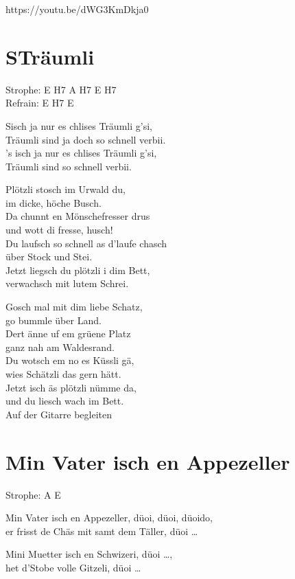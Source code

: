 \documentclass[
  letterpaper,
  twoside=false]{scrbook}
\begin{document}
https://youtu.be/dWG3KmDkja0

\hypertarget{struxe4umli}{%
\chapter{S\textquotesingle Träumli}\label{struxe4umli}}

Strophe: E H7 A H7 E H7\\
Refrain: E H7 E

S\textquotesingle isch ja nur es chlises Träumli g'si,\\
Träumli sind ja doch so schnell verbii.\\
's isch ja nur es chlises Träumli g'si,\\
Träumli sind so schnell verbii.

Plötzli stosch im Urwald du,\\
im dicke, höche Busch.\\
Da chunnt en Mönschefresser drus\\
und wott di fresse, husch!\\
Du laufsch so schnell as d'laufe chasch\\
über Stock und Stei.\\
Jetzt liegsch du plötzli i dim Bett,\\
verwachsch mit lutem Schrei.

Gosch mal mit dim liebe Schatz,\\
go bummle über Land.\\
Dert änne uf em grüene Platz\\
ganz nah am Waldesrand.\\
Du wotsch em no es Küssli gä,\\
wies Schätzli das gern hätt.\\
Jetzt isch äs plötzli nümme da,\\
und du liesch wach im Bett.\\
Auf der Gitarre begleiten

\hypertarget{min-vater-isch-en-appezeller}{%
\chapter{Min Vater isch en
Appezeller}\label{min-vater-isch-en-appezeller}}

Strophe: A E

Min Vater isch en Appezeller, düoi, düoi, düoido,\\
er frisst de Chäs mit samt dem Täller, düoi \ldots{}

Mini Muetter isch en Schwizeri, düoi \ldots,\\
het d'Stobe volle Gitzeli, düoi \ldots{}
\end{document}
